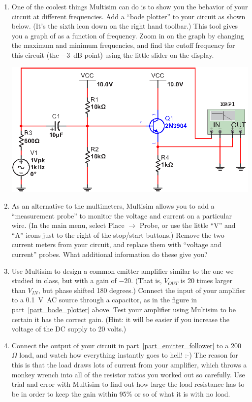\begin{enumerate}[wide]
\item One of the coolest things Multisim can do is to show you the behavior of your circuit at different frequencies.  Add a ``bode plotter'' to your circuit as shown below.  (It's the sixth icon down on the right hand toolbar.)  This tool gives you a graph of   as a function of frequency.  Zoom in on the graph by changing the maximum and minimum frequencies, and find the cutoff frequency for this circuit (the $-3$~dB point) using the little slider on the display. \label{part_bode_plotter}
\begin{center}
\includegraphics{multisim/bode_plotter.eps}
\end{center}

\item As an alternative to the multimeters, Multisim allows you to add a ``measurement probe'' to monitor the voltage and current on a particular wire.  (In the main menu, select Place $\longrightarrow$ Probe, or use the little ``V'' and ``A'' icons just to the right of the stop/start buttons.)  Remove the two current meters from your circuit, and replace them with ``voltage and current'' probes.   What additional information do these give you?

\item Use Multisim to design a common emitter amplifier similar to the one we studied in class, but with a gain of  $-20$.  (That is, $V_{OUT}$ is 20 times larger than $V_{IN}$, but phase shifted 180 degrees.)  Connect the input of your amplifier to a 0.1~V~AC source through a capacitor, as in the figure in part~\ref{part_bode_plotter} above.  Test your amplifier using Multisim to be certain it has the correct gain.  (Hint: it will be easier if you increase the voltage of the DC supply to 20 volts.) \label{part_emitter_follower}

\item Connect the output of your circuit in part~\ref{part_emitter_follower} to a 200~$\Omega$ load, and watch how everything instantly goes to hell!  :-)  The reason for this is that the load draws lots of current from your amplifier, which throws a monkey wrench into all of the resistor ratios you worked out so carefully.  Use trial and error with Multisim to find out how large the load resistance has to be in order to keep the gain within 95\% or so of what it is with no load. \label{part_problems_with_load}


\end{enumerate}

